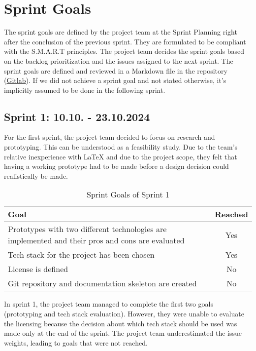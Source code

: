 \section{Sprint Goals}\label{sec:sprint-goals}
The sprint goals are defined by the project team at the Sprint Planning right after the conclusion of the previous sprint.
They are formulated to be compliant with the S.M.A.R.T principles.
The project team decides the sprint goals based on the backlog
prioritization and the issues assigned to the next sprint.
The sprint goals are defined and reviewed in a Markdown file in the repository (\href{https://gitlab.ti.bfh.ch/decibel-threshold-event-displayer/decibel-threshold-event-displayer/-/blob/main/doc/scrum/sprints.md}{Gitlab}).
If we did not achieve a sprint goal and not stated otherwise, it's implicitly assumed to be done in the following sprint.

\subsection{Sprint 1: 10.10. - 23.10.2024}\label{subsec:sprint-1}
For the first sprint, the project team decided to focus on research and prototyping.
This can be understood as a feasibility study.
Due to the team's relative inexperience with LaTeX and due to the project scope, they felt that having a working prototype had to be
made before a design decision could realistically be made. \\
\begin{table}[H]
    \centering
    \begin{tabularx}{\textwidth}{X c}
        \toprule
        \textbf{Goal}                                                                                    & \textbf{Reached} \\
        \midrule
        Prototypes with two different technologies are implemented and their pros and cons are evaluated & Yes              \\
        \midrule
        Tech stack for the project has been chosen                                                       & Yes              \\
        \midrule
        License is defined                                                                               & No               \\
        \midrule
        Git repository and documentation skeleton are created                                            & No               \\
        \bottomrule
    \end{tabularx}
    \caption{Sprint Goals of Sprint 1}\label{tab:sprint_goals1}
\end{table}
In sprint 1, the project team managed to complete the first two goals (prototyping and tech stack evaluation).
However, they were unable to evaluate the licensing because the decision about which tech stack should be used was made only at the end of the sprint.
The project team underestimated the issue weights, leading to goals that were not reached.

